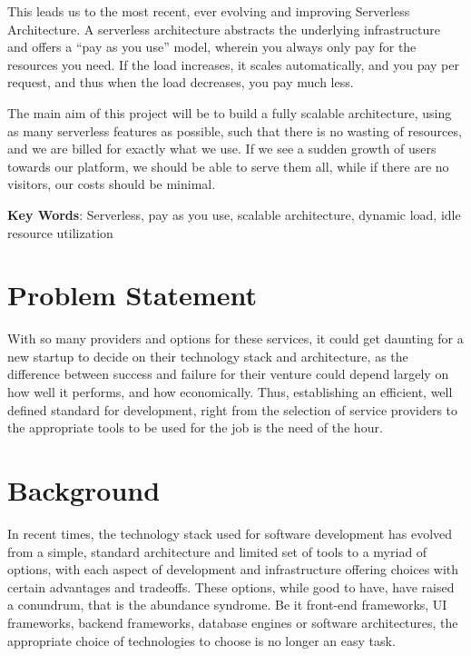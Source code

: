 \smallskip

This leads us to the most recent, ever evolving and improving Serverless Architecture. A serverless architecture abstracts 
the underlying infrastructure and offers a “pay as you use” model, wherein you always only pay for the resources you need. 
If the load increases, it scales automatically, and you pay per request, and thus when the load decreases, you pay much less.

\smallskip

The main aim of this project will be to build a fully scalable architecture, using as many serverless features as possible, 
such that there is no wasting of resources, and we are billed for exactly what we use. If we see a sudden growth of users 
towards our platform, we should be able to serve them all, while if there are no visitors, our costs should be minimal. 

\textbf{Key Words}: Serverless, pay as you use, scalable architecture, dynamic load, idle resource utilization 

\section{Problem Statement} 

With so many providers and options for these services, it could get daunting for a new startup to decide on their technology stack and architecture, as the difference between success and failure for their venture could depend largely on how well it performs, and how economically. Thus, establishing an efficient, well defined standard for development, right from the selection of service providers to the appropriate tools to be used for the job is the need of the hour. 

\section{Background} 

In recent times, the technology stack used for software development has evolved from a simple, standard architecture and limited set of tools to a myriad of options, with each aspect of development and infrastructure offering choices with certain advantages and tradeoffs. These options, while good to have, have raised a conundrum, that is the abundance syndrome. Be it front-end frameworks, UI frameworks, backend frameworks, database engines or software architectures, the appropriate choice of technologies to choose is no longer an easy task.

